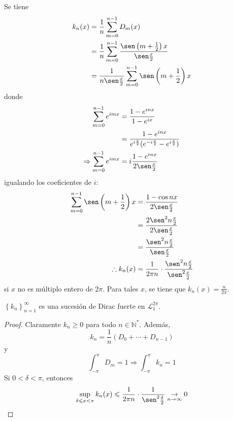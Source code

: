 \documentclass[12pt]{report}
\newcounter{it}
\theoremstyle{largebreak}
\renewcommand{\leq}{\ensuremath{\leqslant}}
\renewcommand{\geq}{\ensuremath{\geqslant}}
\begin{document}
    Se tiene
    \begin{equation*}
        \begin{split}
            k_n(x)&=\frac{1}{n}\sum_{ m=0}^{ n-1}D_m(x)\\
            &=\frac{1}{n}\sum_{ m=0}^{ n-1}\frac{\sen\left(m+\frac{1}{2} \right)x}{\sen\frac{x}{2}}\\
            &=\frac{1}{n\sen\frac{x}{2}}\sum_{ m=0}^{ n-1}\sen\left(m+\frac{1}{2} \right)x\\
        \end{split}
    \end{equation*}
    donde
    \begin{equation*}
        \begin{split}
            \sum_{ m=0}^{ n-1}e^{ imx}&=\frac{1-e^{ inx}}{1-e^{ ix}}\\
            &=\frac{1-e^{ inx}}{e^{ i\frac{x}{2}}(e^{ -i\frac{x}{2}}-e^{ i\frac{x}{2}})}\\
            \Rightarrow \sum_{ m=0}^{ n-1}e^{ imx}&=i\frac{1-e^{ inx}}{2\sen\frac{x}{2}}\\
        \end{split}
    \end{equation*}
    igualando los coeficientes de $i$:
    \begin{equation*}
        \begin{split}
            \sum_{ m=0}^{ n-1}\sen\left(m+\frac{1}{2} \right)x&=\frac{1-\cos nx}{2\sen\frac{x}{2}}\\
            &=\frac{2\sen^2 n\frac{x}{2}}{2\sen\frac{x}{2}}\\
            &=\frac{\sen^2 n\frac{x}{2}}{\sen\frac{x}{2}}\\
            \therefore k_n(x)&=\frac{1}{2\pi n}\cdot\frac{\sen^2 n\frac{x}{2}}{\sen^2\frac{x}{2}}\\
        \end{split}
    \end{equation*}
    si $x$ no es múltiplo entero de $2\pi$. Para tales $x$, se tiene que $k_n(x)=\frac{n}{2\pi}$.

    \begin{propo}
        $\left\{k_n \right\}_{ n=1}^\infty$ es una sucesión de Dirac fuerte en $\mathcal{L}_1^{2\pi}$.
    \end{propo}

    \begin{proof}
        Claramente $k_n\geq 0$ para todo $n\in\mathbb{N}^*$. Además,
        \begin{equation*}
            k_n=\frac{1}{n}\left(D_0+\cdots+D_{ n-1} \right)
        \end{equation*}
        y
        \begin{equation*}
            \int_{ -\pi}^{\pi}D_m=1\Rightarrow \int_{ -\pi}^{ \pi}k_n=1
        \end{equation*}
        Si $0<\delta<\pi$, entonces
        \begin{equation*}
            \sup_{ \delta\leq x<\pi}k_n(x)\leq\frac{1}{2\pi n}\cdot\frac{1}{\sen^2\frac{\delta}{2}}\underset{n\rightarrow\infty}{\rightarrow}0
        \end{equation*}
    \end{proof}
\end{document}
